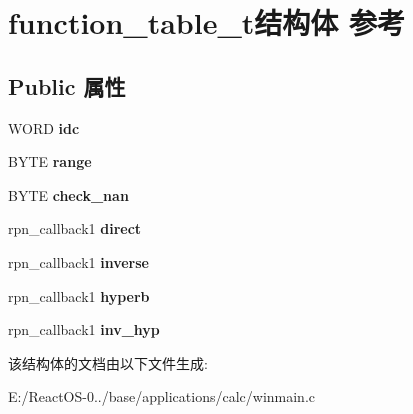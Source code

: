 \hypertarget{structfunction__table__t}{}\section{function\+\_\+table\+\_\+t结构体 参考}
\label{structfunction__table__t}
\subsection*{Public 属性}
\begin{DoxyCompactItemize}
\item 
\mbox{\label{structfunction__table__t_aabe5091602ddaf9fdd65b9cb026c39ec}} 
W\+O\+RD {\bfseries idc}
\item 
\mbox{\label{structfunction__table__t_a1d05eebfcc413783471710d59ed2ede1}} 
B\+Y\+TE {\bfseries range}
\item 
\mbox{\label{structfunction__table__t_aed4797e8d45d0a5eb9deeb3032c5a745}} 
B\+Y\+TE {\bfseries check\+\_\+nan}
\item 
\mbox{\label{structfunction__table__t_a237c6f3b9363c24ec4b8a44c82979bd9}} 
rpn\+\_\+callback1 {\bfseries direct}
\item 
\mbox{\label{structfunction__table__t_a767523708fef6e490b74509fab0f5299}} 
rpn\+\_\+callback1 {\bfseries inverse}
\item 
\mbox{\label{structfunction__table__t_aa14dde5d5ab760642c5b7712b9eed67c}} 
rpn\+\_\+callback1 {\bfseries hyperb}
\item 
\mbox{\label{structfunction__table__t_a7ffedc8984a7be7576eab60a433c1143}} 
rpn\+\_\+callback1 {\bfseries inv\+\_\+hyp}
\end{DoxyCompactItemize}


该结构体的文档由以下文件生成\+:\begin{DoxyCompactItemize}
\item 
E\+:/\+React\+O\+S-\/0../base/applications/calc/winmain.\+c\end{DoxyCompactItemize}
